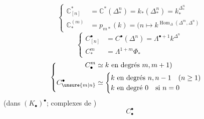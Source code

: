 

\[
\left\{\begin{aligned}
\mathbb C_{[n]}^*&=\mathbb C^*(\Delta_*^n)=k_*(\Delta_*^n)=k_*^{\Delta_*^n}\\
\mathbb C_*^{(m)}&=p_{m*}(k)=(n\longmapsto k^{\operatorname{Hom}_\Delta(\Delta^m,\Delta^n)}
\end{aligned}\right.
\]
\[
\left\{\begin{aligned}
C_{[n]}^\bullet&=C^\bullet(\Delta^n)=\Lambda^{\bullet+1}k^{\Delta^n}\\
C_*^m&=\Lambda^{1+m}\Phi_*
\end{aligned}\right.
\]
\[
\left\{\begin{aligned}
C_\bullet^m&\simeq k\ \text{en degrés }m,m+1)\\
C_{\unsure{m|n}}^\bullet&\simeq
\begin{cases}k\ \text{en degrés }n,n-1\quad(n\geq1)\\
k\ \text{en degré }0\quad\text{si }n=0
\end{cases}
\end{aligned}\right.
\]
(dans $(K_\bullet)^\bullet$; complexes de )
\[
C_\bullet^\bullet
\]

